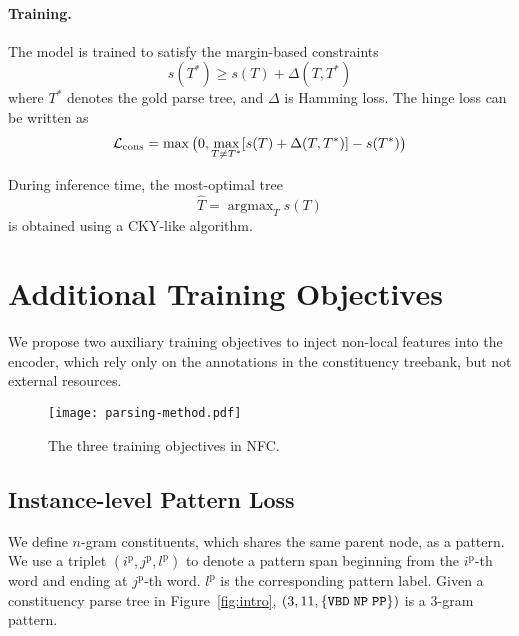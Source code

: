 \documentclass[11pt]{article}
\DeclareMathOperator*{\argmax}{argmax}
\begin{document}
\paragraph{Training.}
The model is trained to satisfy the margin-based constraints 
\begin{equation}
    s(T^*) \geq s(T) + \Delta(T, T^*)
\end{equation}
where $T^*$ denotes the gold parse tree, and $\Delta$ is Hamming loss. 
The hinge loss can be written as
\begin{equation}
\small
    \mathcal{L}_{ \mathrm{cons}} = \max \big(0, \max_{T \neq T^*}[s(T) + \Delta(T, T^*)] - s(T^*)\big)
    \label{eq:margin_loss}
\end{equation}

During inference time, the most-optimal tree
\begin{equation}
    \hat{T} = \argmax_T s(T)
\end{equation}
is obtained using a CKY-like algorithm. 

\section{Additional Training Objectives}
We propose two auxiliary training objectives to inject non-local features into the encoder, which rely only on the annotations in the constituency treebank, but not external resources. 

\begin{figure}
    \centering
    \texttt{[image: parsing-method.pdf]}
    \caption{The three training objectives in NFC.}
    \label{fig:method}
\end{figure}

\subsection{Instance-level Pattern Loss}
\label{sec:pattern_loss}
We define $n$-gram constituents, which shares the same parent node, as a pattern. 
We use a triplet $(i^\mathrm{p}, j^\mathrm{p}, l^\mathrm{p})$ to denote a pattern span beginning from the $i^\mathrm{p}$-th word and ending at $j^\mathrm{p}$-th word. 
$l^\mathrm{p}$ is the corresponding pattern label. 
Given a constituency parse tree in Figure~\ref{fig:intro}, $(3, 11, {\tt \{VBD \; NP \; PP\}})$ is a $3$-gram pattern.
\end{document}
